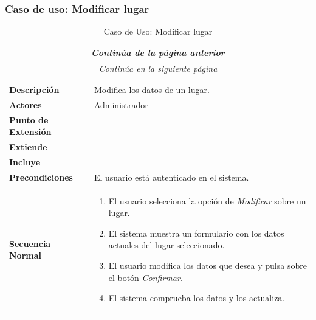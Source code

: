 \subsubsection*{Caso de uso: Modificar lugar }
\begin{longtable}{| p{4cm} | p{10cm} |}
\endfirsthead
\multicolumn{2}{c}{\textit{Continúa de la página anterior}}\\[12pt]
\hline
\endhead
\hline
\multicolumn{2}{c}{\textit{Continúa en la siguiente página}} \\
\endfoot
\hline
\caption{Caso de Uso: Modificar lugar}\label{fig:1}\\
\endlastfoot


\hline
\multicolumn{2}{|c|}{\textbf{CU$<$36$>$ - Modificar Lugar}} \\

\hline
\textbf{Descripción} &
Modifica los datos de un lugar.\\

\hline
\textbf{Actores} &
Administrador\\

\hline
\textbf{Punto de Extensión} &
\\

\hline
\textbf{Extiende} &
\\

\hline
\textbf{Incluye} &
\\

\hline
\textbf{Precondiciones} &
El usuario está autenticado en el sistema.\\

\hline
\textbf{Secuencia Normal} &\mbox{}\par\vspace{-\baselineskip}
\begin{enumerate}[leftmargin=0.7cm, topsep=0.1cm]
\item El usuario selecciona la opción de \textit{Modificar} sobre un lugar.
\item El sistema muestra un formulario con los datos actuales del lugar seleccionado.
\item El usuario modifica los datos que desea y pulsa sobre el botón \textit{Confirmar}.
\item El sistema comprueba los datos y los actualiza.
\end{enumerate}



\end{longtable}
